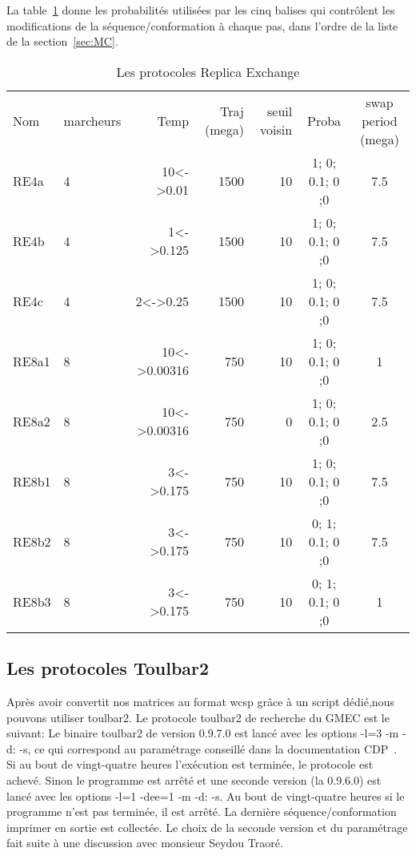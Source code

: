 La table~\ref{tab:protoRE} donne les probabilités utilisées par les cinq balises qui contrôlent les modifications de la séquence/conformation à chaque pas, dans l'ordre de la liste de la section~\ref{sec:MC}. 
    
    \begin{table}[!htbp]
      \centering

      \begin{tabular}{llrrrcc}

        \toprule
        Nom & marcheurs &Temp & Traj (mega)& seuil voisin  & Proba & swap period (mega)\\
        \cmidrule{1-7}
        RE4a   & 4 & 10<->0.01    &  1500 & 10 & 1; 0; 0.1; 0 ;0 &  7.5\\  
        RE4b   & 4 & 1<->0.125    &  1500 & 10 & 1; 0; 0.1; 0 ;0 &  7.5\\  
        RE4c   & 4 & 2<->0.25     &  1500 & 10 & 1; 0; 0.1; 0 ;0 &  7.5\\  
        RE8a1  & 8 & 10<->0.00316 &  750  & 10 & 1; 0; 0.1; 0 ;0 &  1\\  
        RE8a2  & 8 & 10<->0.00316 &  750  &  0 & 1; 0; 0.1; 0 ;0 &  2.5\\  
        RE8b1  & 8 & 3<->0.175    &  750  & 10 & 1; 0; 0.1; 0 ;0 &  7.5\\
        RE8b2  & 8 & 3<->0.175    &  750  & 10 & 0; 1; 0.1; 0 ;0 &  7.5\\
        RE8b3  & 8 & 3<->0.175    &  750  & 10 & 0; 1; 0.1; 0 ;0 &  1\\
        \bottomrule

      \end{tabular}      
      \caption{Les protocoles Replica Exchange}
\label{tab:protoRE}      
    \end{table}

   \subsection{Les protocoles Toulbar2} 


Après avoir convertit nos matrices au format wcsp grâce à un script dédié,nous pouvons utiliser toulbar2.
Le protocole toulbar2 de recherche du GMEC est le suivant:
Le binaire toulbar2 de version 0.9.7.0 est lancé avec les options -l=3 -m -d: -s, ce qui correspond au paramétrage conseillé dans la documentation CDP~\citep{reftoulbar1,reftoulbar2}. Si au bout de vingt-quatre heures l'exécution est terminée, le protocole est achevé. Sinon le programme est arrêté et une seconde version (la 0.9.6.0) est lancé avec les options -l=1 -dee=1 -m -d: -s. Au bout de vingt-quatre heures si le programme n'est pas terminée, il est arrêté. La dernière séquence/conformation imprimer en sortie est collectée. Le choix de la seconde version et du paramétrage fait suite à une discussion avec monsieur Seydou Traoré.  

